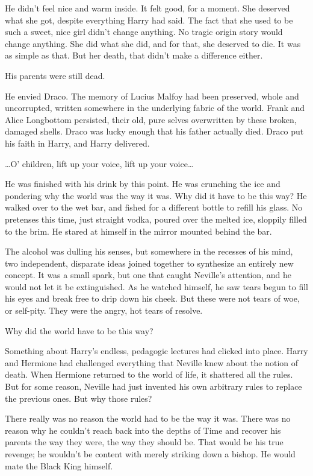 He didn’t feel nice and warm inside. It felt good, for a moment. She deserved what she got, despite everything Harry had said. The fact that she used to be such a sweet, nice girl didn’t change anything. No tragic origin story would change anything. She did what she did, and for that, she deserved to die. It was as simple as that. But her death, that didn’t make a difference either.

His parents were still dead.

He envied Draco. The memory of Lucius Malfoy had been preserved, whole and uncorrupted, written somewhere in the underlying fabric of the world. Frank and Alice Longbottom persisted, their old, pure selves overwritten by these broken, damaged shells. Draco was lucky enough that his father actually died. Draco put his faith in Harry, and Harry delivered.

…O’ children, lift up your voice, lift up your voice…

He was finished with his drink by this point. He was crunching the ice and pondering why the world was the way it was. Why did it have to be this way? He walked over to the wet bar, and fished for a different bottle to refill his glass. No pretenses this time, just straight vodka, poured over the melted ice, sloppily filled to the brim. He stared at himself in the mirror mounted behind the bar.

The alcohol was dulling his senses, but somewhere in the recesses of his mind, two independent, disparate ideas joined together to synthesize an entirely new concept. It was a small spark, but one that caught Neville’s attention, and he would not let it be extinguished. As he watched himself, he saw tears begun to fill his eyes and break free to drip down his cheek. But these were not tears of woe, or self-pity. They were the angry, hot tears of resolve.

Why did the world have to be this way?

Something about Harry’s endless, pedagogic lectures had clicked into place. Harry and Hermione had challenged everything that Neville knew about the notion of death. When Hermione returned to the world of life, it shattered all the rules. But for some reason, Neville had just invented his own arbitrary rules to replace the previous ones. But why those rules?

There really was no reason the world had to be the way it was. There was no reason why he couldn’t reach back into the depths of Time and recover his parents the way they were, the way they should be. That would be his true revenge; he wouldn’t be content with merely striking down a bishop. He would mate the Black King himself.

